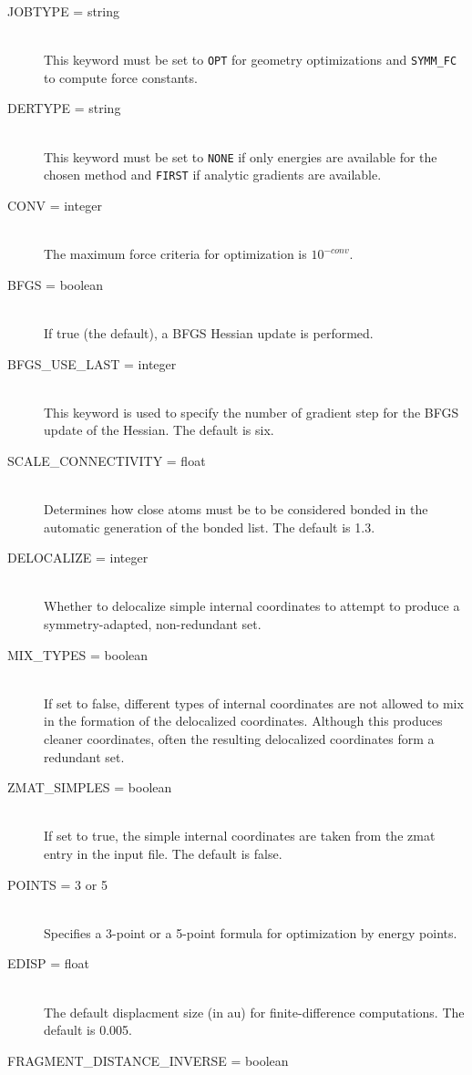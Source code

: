 \begin{description}
\item[JOBTYPE = string]\mbox{}\\
This keyword must be set to {\tt OPT} for geometry optimizations and
{\tt SYMM\_FC} to compute force constants.
\item[DERTYPE = string]\mbox{}\\
This keyword must be set to {\tt NONE} if only energies are available
for the chosen method and {\tt FIRST} if analytic gradients are available.
\item[CONV = integer]\mbox{}\\
The maximum force criteria for optimization is $10^{-conv}$.
\item[BFGS = boolean]\mbox{}\\
If true (the default), a BFGS Hessian update is performed.
\item[BFGS\_USE\_LAST = integer]\mbox{}\\
This keyword is used to specify the number of gradient step for the BFGS
update of the Hessian.  The default is six.  
\item[SCALE\_CONNECTIVITY = float]\mbox{}\\
Determines how close atoms must be to be considered bonded in the automatic
generation of the bonded list.  The default is 1.3.
\item[DELOCALIZE = integer]\mbox{}\\
Whether to delocalize simple internal coordinates to attempt to produce
a symmetry-adapted, non-redundant set.
\item[MIX\_TYPES = boolean]\mbox{}\\
If set to false, different types of internal coordinates are not allowed
to mix in the formation of the delocalized coordinates.  Although this
produces cleaner coordinates, often the resulting delocalized coordinates
form a redundant set.
\item[ZMAT\_SIMPLES = boolean]\mbox{}\\
If set to true, the simple internal coordinates are taken from the zmat
entry in the input file.  The default is false.
\item[POINTS = 3 or 5]\mbox{}\\
Specifies a 3-point or a 5-point formula for optimization by energy points.
\item[EDISP = float]\mbox{}\\
The default displacment size (in au) for finite-difference computations.  The
default is 0.005.
\item[FRAGMENT\_DISTANCE\_INVERSE = boolean]\mbox{}\\

\end{description}
